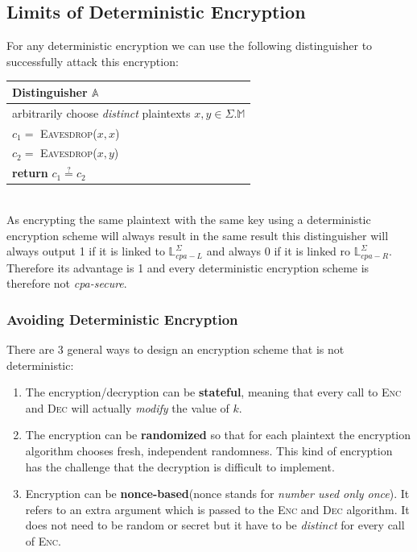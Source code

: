 \documentclass{article}
\begin{document}
\begin{adjustwidth}{2em}{2em}
			\subsection{Limits of Deterministic Encryption}
			\begin{adjustwidth}{2em}{2em}
				For any deterministic encryption we can use the following distinguisher to successfully attack this encryption:
				\begin{center}
					\begin{tabular}{|l|}
						\hline
						\cellcolor{gray!80} Distinguisher $\mathbb{A}$ \\
						\hline
						arbitrarily choose \textit{distinct} plaintexts $x,y \in \Sigma.\mathbb{M}$ \\
						$c_1 =$ \textsc{Eavesdrop}($x,x$) \\
						$c_2 =$ \textsc{Eavesdrop}($x,y$) \\
						\textbf{return} $c_1 \stackrel{?}{=} c_2$ \\
						\hline
					\end{tabular}
				\end{center}
				\hfill \\
				As encrypting the same plaintext with the same key using a deterministic encryption scheme will always result in the same result this distinguisher will always output 1 if it is linked to $\mathbb{L}^{\Sigma}_{cpa-L}$ and always 0 if it is linked ro $\mathbb{L}^{\Sigma}_{cpa-R}$. Therefore its advantage is 1 and every deterministic encryption scheme is therefore not \textit{cpa-secure}.
				\subsubsection{Avoiding Deterministic Encryption}
				\begin{adjustwidth}{2em}{1em}
					There are 3 general ways to design an encryption scheme that is not deterministic:
					\begin{enumerate}
						\item The encryption/decryption can be \textbf{stateful}, meaning that every call to \textsc{Enc} and \textsc{Dec} will actually \textit{modify} the value of $k$.
						\item The encryption can be \textbf{randomized} so that for each plaintext the encryption algorithm chooses fresh, independent randomness. This kind of encryption has the challenge that the decryption is difficult to implement.
						\item Encryption can be \textbf{nonce-based}(nonce stands for \textit{number used only once}). It refers to an extra argument which is passed to the \textsc{Enc} and \textsc{Dec} algorithm. It does not need to be random or secret but it have to be \textit{distinct} for every call of \textsc{Enc}.
					\end{enumerate}
				\end{adjustwidth}
			\end{adjustwidth}
			\newpage

\end{adjustwidth}
\end{document}
